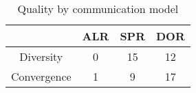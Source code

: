 \begin{table}
	\centering
	\caption{Quality by communication model}
	\begin{tabular}{cccc}
		& ALR&SPR&DOR\\\midrule
		Diversity & 0 & 15 & 12 \\
		Convergence & 1 & 9 & 17
	\end{tabular}
	\label{tab:overallComm}
\end{table}